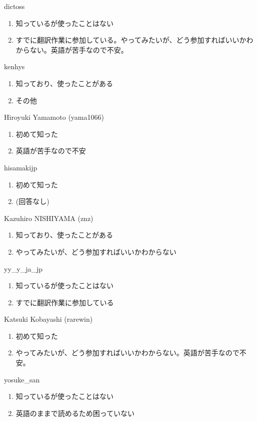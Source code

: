 \begin{prework}{ dictoss }
  \begin{enumerate}
  \item 知っているが使ったことはない
  \item すでに翻訳作業に参加している。やってみたいが、どう参加すればいいかわからない。英語が苦手なので不安。
  \end{enumerate}
\end{prework}

\begin{prework}{ kenhys }
  \begin{enumerate}
  \item 知っており、使ったことがある
  \item その他
  \end{enumerate}
\end{prework}

\begin{prework}{ Hiroyuki Yamamoto (yama1066) }
  \begin{enumerate}
  \item 初めて知った
  \item 英語が苦手なので不安
  \end{enumerate}
\end{prework}

\begin{prework}{ hisamakijp }
  \begin{enumerate}
  \item 初めて知った
  \item (回答なし)
  \end{enumerate}
\end{prework}

\begin{prework}{ Kazuhiro NISHIYAMA (znz) }
  \begin{enumerate}
  \item 知っており、使ったことがある
  \item やってみたいが、どう参加すればいいかわからない
  \end{enumerate}
\end{prework}

\begin{prework}{ yy\_y\_ja\_jp }
  \begin{enumerate}
  \item 知っているが使ったことはない
  \item すでに翻訳作業に参加している
  \end{enumerate}
\end{prework}

\begin{prework}{ Katsuki Kobayashi (rarewin) }
  \begin{enumerate}
  \item 初めて知った
  \item やってみたいが、どう参加すればいいかわからない。英語が苦手なので不安。
  \end{enumerate}
\end{prework}

\begin{prework}{ yosuke\_san }
  \begin{enumerate}
  \item 知っているが使ったことはない
  \item 英語のままで読めるため困っていない
  \end{enumerate}
\end{prework}

